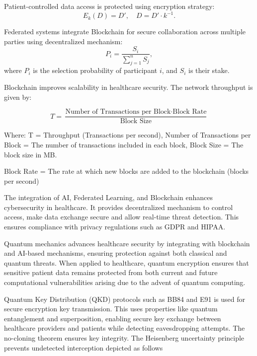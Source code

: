 \documentclass[pdflatex,sn-mathphys-num]{sn-jnl}
\theoremstyle{thmstyleone}%
\theoremstyle{thmstyletwo}%
\theoremstyle{thmstylethree}%
\begin{document}
Patient-controlled data access is protected using encryption strategy:
\begin{equation}
E_k(D) = D', \quad D = D' \cdot k^{-1}.
\end{equation}

Federated systems integrate Blockchain \cite{bib9}for secure collaboration across multiple parties using decentralized mechanism:
\begin{equation}
P_i = \frac{S_i}{\sum_{j=1}^n S_j},
\end{equation}
where \(P_i\) is the selection probability of participant \(i\), and \(S_i\) is their stake.

Blockchain improves scalability in healthcare security. The network throughput is given by\cite{bib8}:

\begin{equation}
  T = \frac{\text{Number of Transactions per Block} \cdot \text{Block Rate}}{\text{Block Size}}  
\end{equation}

\noindent Where:
 T = Throughput (Transactions per second), Number of Transactions per Block = The number of transactions included in each block, Block Size = The block size in MB.

\noindent Block Rate = The rate at which new blocks are added to the blockchain (blocks per second)

The integration of AI, Federated Learning, and Blockchain enhances cybersecurity in healthcare. It provides decentralized mechanism to control access, make data exchange secure and allow real-time threat detection. This ensures compliance with privacy regulations such as GDPR and HIPAA\cite{bib10}.

Quantum mechanics advances healthcare security by integrating with blockchain and AI-based mechanisms\cite{bib11,bib12}, ensuring protection against both classical and quantum threats. When applied to healthcare, quantum encryption ensures that sensitive patient data remains protected from both current and future computational vulnerabilities arising due to the advent of quantum computing.  

Quantum Key Distribution (QKD) protocols such as BB84 and E91 is used for secure encryption key transmission. This uses properties like quantum entanglement and superposition, enabling secure key exchange between healthcare providers and patients while detecting eavesdropping attempts. The no-cloning theorem ensures key integrity. The Heisenberg uncertainty principle prevents undetected interception depicted as follows 
\end{document}
